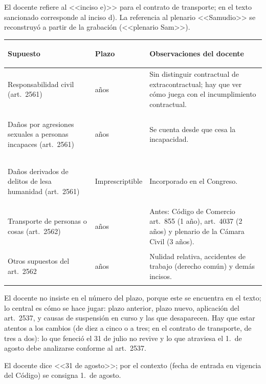 \documentclass[12pt,oneside]{book}
\begin{document}
\begin{note}
El docente refiere al <<inciso e)>> para el contrato de transporte; en el texto sancionado corresponde al inciso d). La referencia al plenario <<Samudio>> se reconstruy\'o a partir de la grabaci\'on (<<plenario Sam>>).
\end{note}

\begin{table}[H]
\centering\small
\begin{tabularx}{\textwidth}{>{\bfseries\raggedright\arraybackslash}p{3.8cm}>{\raggedright\arraybackslash}p{2.3cm}>{\raggedright\arraybackslash}X}
\toprule
Supuesto & Plazo & Observaciones del docente \\
\midrule
Responsabilidad civil (art.\ 2561) & 3 a\~nos & Sin distinguir contractual de extracontractual; hay que ver c\'omo juega con el incumplimiento contractual. \\
Da\~nos por agresiones sexuales a personas incapaces (art.\ 2561) & 10 a\~nos & Se cuenta desde que cesa la incapacidad. \\
Da\~nos derivados de delitos de lesa humanidad (art.\ 2561) & Imprescriptible & Incorporado en el Congreso. \\
Transporte de personas o cosas (art.\ 2562) & 2 a\~nos & Antes: C\'odigo de Comercio art.\ 855 (1 a\~no), art.\ 4037 (2 a\~nos) y plenario de la C\'amara Civil (3 a\~nos). \\
Otros supuestos del art.\ 2562 & 2 a\~nos & Nulidad relativa, accidentes de trabajo (derecho com\'un) y dem\'as incisos. \\
\bottomrule
\end{tabularx}
\end{table}

\begin{important}
El docente no insiste en el n\'umero del plazo, porque este se encuentra en el texto; lo central es c\'omo se hace jugar: plazo anterior, plazo nuevo, aplicaci\'on del art.\ 2537, y causas de suspensi\'on en curso y las que desaparecen. Hay que estar atentos a los cambios (de diez a cinco o a tres; en el contrato de transporte, de tres a dos): lo que feneci\'o el 31 de julio no revive y lo que atraviesa el 1.\textordmasculine\ de agosto debe analizarse conforme al art.\ 2537.
\end{important}

\begin{note}
El docente dice <<31 de agosto>>; por el contexto (fecha de entrada en vigencia del C\'odigo) se consigna 1.\textordmasculine\ de agosto.
\end{note}
\end{document}
